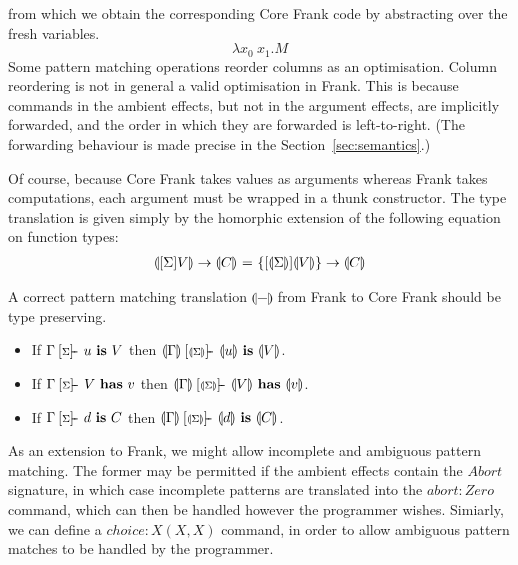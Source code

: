 \documentclass[preprint]{sigplanconf}
\makeatletter
\newcommand{\many}{\overline}
\newcommand{\pc}[1]{\llparenthesis{#1}\rrparenthesis}
\newcommand\ba{\begin{array}}
\newcommand\ea{\end{array}}
\newenvironment{equations}{\[\ba{@{}r@{~}c@{~}l@{}}}{\ea\]}
\newcommand{\judgeword}[1]{~\mathbf{#1}~}
\newcommand{\sigentails}[1]{\mathbin{[{\text{\scriptsize ${#1}$}}]\!\text{-\!-}}\,}
\newcommand{\makes}[4]  {#1 \sigentails{#2} {#3} \judgeword{is} {#4}}
\newcommand{\has}[4] {#1 \sigentails{#2} {#3} \judgeword{has} {#4}}
\newcommand{\can}[4]{#1 \sigentails{#2} {#3} \judgeword{is} {#4}}
\newcommand{\does}[3]{#1 \vdash {#2} \judgeword{has} {#3}}
\newcommand{\makesgs}{\makes{\Gamma}{\sigs}}
\newcommand{\hasgs}{\has{\Gamma}{\sigs}}
\newcommand{\cangs}{\can{\Gamma}{\sigs}}
\newcommand{\doesg}{\does{\Gamma}}
\newcommand{\sigs}{\Sigma}
\newcommand{\effbox}[1]{[#1]}
\newcommand{\var}{\mathit}
\newcommand{\thunk}[1]{\{{#1}\}}
\makeatother
\begin{document}
%
from which we obtain the corresponding Core Frank code by abstracting
over the fresh variables.
%
\[
\lambda x_0~x_1.M
\]
Some pattern matching operations reorder columns as an
optimisation. Column reordering is not in general a valid optimisation
in Frank. This is because commands in the ambient effects, but not in
the argument effects, are implicitly forwarded, and the order in which
they are forwarded is left-to-right. (The forwarding behaviour is made
precise in the Section~\ref{sec:semantics}.)

Of course, because Core Frank takes values as arguments whereas Frank
takes computations, each argument must be wrapped in a thunk
constructor.
%
The type translation is given simply by the homorphic extension of the
following equation on function types:
\begin{equations}
\pc{\effbox{\sigs}V} \to \pc{C} &=& \thunk{\effbox{\pc{\sigs}}\pc{V}} \to \pc{C} \\
\end{equations}

A correct pattern matching translation $\pc{-}$ from Frank to Core
Frank should be type preserving.
\begin{itemize}
\item If $\makesgs{u}{V}$ then $\makes{\pc{\Gamma}}{\pc{\sigs}}{\pc{u}}{\pc{V}}$.
\item If $\hasgs{V}{v}$   then $\has{\pc{\Gamma}}{\pc{\sigs}}{\pc{V}}{\pc{v}}$.
\item If $\cangs{d}{C}$   then $\can{\pc{\Gamma}}{\pc{\sigs}}{\pc{d}}{\pc{C}}$.
\end{itemize}

As an extension to Frank, we might allow incomplete and ambiguous
pattern matching. The former may be permitted if the ambient effects
contain the $\var{Abort}$ signature, in which case incomplete patterns
are translated into the $\var{abort}:\var{Zero}$ command, which can
then be handled however the programmer wishes. Simiarly, we can define
a $\var{choice}:X(X, X)$ command, in order to allow ambiguous pattern
matches to be handled by the programmer.

\end{document}
